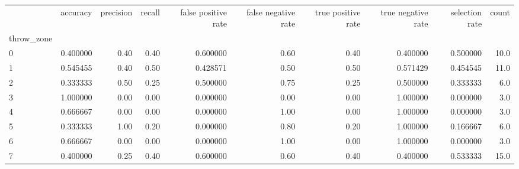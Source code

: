 \begin{tabular}{lrrrrrrrrr}
\toprule
{} &  accuracy &  precision &  recall &  false positive rate &  false negative rate &  true positive rate &  true negative rate &  selection rate &  count \\
throw\_zone &           &            &         &                      &                      &                     &                     &                 &        \\
\midrule
0          &  0.400000 &       0.40 &    0.40 &             0.600000 &                 0.60 &                0.40 &            0.400000 &        0.500000 &   10.0 \\
1          &  0.545455 &       0.40 &    0.50 &             0.428571 &                 0.50 &                0.50 &            0.571429 &        0.454545 &   11.0 \\
2          &  0.333333 &       0.50 &    0.25 &             0.500000 &                 0.75 &                0.25 &            0.500000 &        0.333333 &    6.0 \\
3          &  1.000000 &       0.00 &    0.00 &             0.000000 &                 0.00 &                0.00 &            1.000000 &        0.000000 &    3.0 \\
4          &  0.666667 &       0.00 &    0.00 &             0.000000 &                 1.00 &                0.00 &            1.000000 &        0.000000 &    3.0 \\
5          &  0.333333 &       1.00 &    0.20 &             0.000000 &                 0.80 &                0.20 &            1.000000 &        0.166667 &    6.0 \\
6          &  0.666667 &       0.00 &    0.00 &             0.000000 &                 1.00 &                0.00 &            1.000000 &        0.000000 &    3.0 \\
7          &  0.400000 &       0.25 &    0.40 &             0.600000 &                 0.60 &                0.40 &            0.400000 &        0.533333 &   15.0 \\
\bottomrule
\end{tabular}
